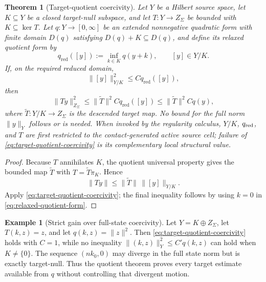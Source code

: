 \documentclass[11pt]{article}
\numberwithin{section}{part}
\theoremstyle{plain}
\newtheorem{theorem}{Theorem}[section]
\theoremstyle{definition}
\newtheorem{example}[example]{Example}
\theoremstyle{remark}
\begin{document}
\begin{theorem}[Target-quotient coercivity]
\label{thm:target-quotient-coercivity}
Let \(Y\) be a Hilbert source space, let \(K\subseteq Y\) be a closed
target-null subspace, and let \(T:Y\to Z_\Sigma\) be bounded with
\(K\subseteq\ker T\).  Let \(q:Y\to[0,\infty]\) be an extended nonnegative
quadratic form with finite domain \(D(q)\) satisfying
\(D(q)+K\subseteq D(q)\), and define its relaxed quotient
form by
\begin{equation}
 \label{eq:relaxed-quotient-form}
 q_{\mathrm{red}}([y])
 :=\inf_{k\in K}q(y+k),
 \qquad [y]\in Y/K.
\end{equation}
If, on the required reduced domain,
\begin{equation}
 \label{eq:target-quotient-coercivity}
 \|[y]\|_{Y/K}^2\le Cq_{\mathrm{red}}([y]),
\end{equation}
then
\begin{equation}
 \label{eq:target-only-bound}
 \|Ty\|_{Z_\Sigma}^2
 \le \|\widetilde T\|^2Cq_{\mathrm{red}}([y])
 \le \|\widetilde T\|^2Cq(y),
\end{equation}
where \(\widetilde T:Y/K\to Z_\Sigma\) is the descended target map.  No
bound for the full norm \(\|y\|_Y\) follows or is needed.  When invoked by
the regularity calculus, \(Y/K\), \(q_{\rm red}\), and \(T\) are first
restricted to the contact-generated active source cell; failure of
\eqref{eq:target-quotient-coercivity} is its complementary local structural
value.
\end{theorem}

\begin{proof}
Because \(T\) annihilates \(K\), the quotient universal property gives the
bounded map \(\widetilde T\) with \(T=\widetilde T\pi_K\).  Hence
\[
 \|Ty\|\le\|\widetilde T\|\,\|[y]\|_{Y/K}.
\]
Apply \eqref{eq:target-quotient-coercivity}; the final inequality follows by
using \(k=0\) in \eqref{eq:relaxed-quotient-form}.
\end{proof}

\begin{example}[Strict gain over full-state coercivity]
\label{ex:strict-quotient-gain}
Let \(Y=K\oplus Z_\Sigma\), let \(T(k,z)=z\), and let
\(q(k,z)=\|z\|^2\).  Then
\eqref{eq:target-quotient-coercivity} holds with \(C=1\), while no inequality
\(\|(k,z)\|_Y^2\le C'q(k,z)\) can hold when \(K\ne\{0\}\).  The sequence
\((nk_0,0)\) may diverge in the full state norm but is exactly target-null.
Thus the quotient theorem proves every target estimate available from \(q\)
without controlling that divergent motion.
\end{example}
\end{document}
